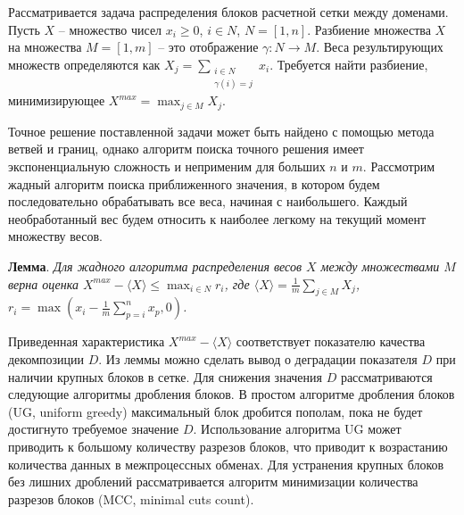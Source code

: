 \documentclass[a4paper,14pt]{extarticle}                     %
\theoremstyle{plain}                                         %
\begin{document}
Рассматривается задача распределения блоков расчетной сетки между доменами.
Пусть $X$ -- множество чисел $x_i \ge 0$, $i \in N$, $N = [1, n]$.
Разбиение множества $X$ на множества $M = [1, m]$ -- это отображение $\gamma: N \rightarrow M$.
Веса результирующих множеств определяются как $X_j = \sum_{\substack{i \in N \\ \gamma(i) = j}}{x_i}$.
Требуется найти разбиение, минимизирующее $X^{max} = \max_{j \in M}{X_j}$.

Точное решение поставленной задачи может быть найдено с помощью метода ветвей и границ, однако алгоритм поиска точного решения имеет экспоненциальную сложность и неприменим для больших $n$ и $m$.
Рассмотрим жадный алгоритм поиска приближенного значения, в котором будем последовательно обрабатывать все веса, начиная с наибольшего.
Каждый необработанный вес будем относить к наиболее легкому на текущий момент множеству весов.

\textbf{Лемма}. \textit{Для жадного алгоритма распределения весов $X$ между множествами $M$ верна оценка $X^{max} - \langle X \rangle \le \max_{i \in N}{r_i}$, где $\langle X \rangle = \frac{1}{m}\sum_{j \in M}{X_j}$, $r_i = \max{\left( x_i - \frac{1}{m} \sum_{p = i}^{n}{x_p}, 0 \right)}$.}

Приведенная характеристика $X^{max} - \langle X \rangle$ соответствует показателю качества декомпозиции $D$.
Из леммы можно сделать вывод о деградации показателя $D$ при наличии крупных блоков в сетке.
Для снижения значения $D$ рассматриваются следующие алгоритмы дробления блоков.
В простом алгоритме дробления блоков (UG, uniform greedy) максимальный блок дробится пополам, пока не будет достигнуто требуемое значение $D$.
Использование алгоритма UG может приводить к большому количеству разрезов блоков, что приводит к возрастанию количества данных в межпроцессных обменах.
Для устранения крупных блоков без лишних дроблений рассматривается алгоритм минимизации количества разрезов блоков (MCC, minimal cuts count).
\end{document}
